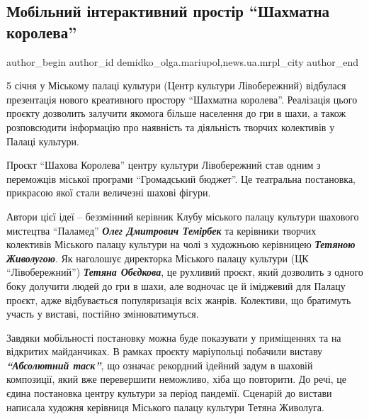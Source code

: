  
 
 
 
 
 
\subsection{Мобільний інтерактивний простір \enquote{Шахматна королева}}
\label{sec:07_01_2021.stz.news.ua.mrpl_city.1.prostir_shahmatna_koroleva}
 
\ifcmt
 author_begin
   author_id demidko_olga.mariupol,news.ua.mrpl_city
 author_end
\fi

5 січня у Міському палаці культури (Центр культури Лівобережний) відбулася
презентація нового креативного простору \enquote{Шахматна королева}. Реалізація цього
проєкту дозволить залучити якомога більше населення до гри в шахи, а також
розповсюдити інформацію про наявність та діяльність творчих колективів у Палаці
культури.


Проєкт \enquote{Шахова Королева} центру культури Лівобережний став одним з переможців
міської програми \enquote{Громадський бюджет}. Це театральна постановка, прикрасою якої
стали величезні шахові фігури.

Автори цієї ідеї – беззмінний керівник Клубу міського палацу культури шахового
мистецтва \enquote{Паламед} \emph{\textbf{Олег Дмитрович Темірбек}} та керівники творчих колективів
Міського палацу культури на чолі з художньою керівницею \emph{\textbf{Тетяною Живолугою}}. Як
наголошує директорка Міського палацу культури (ЦК \enquote{Лівобережний}) \emph{\textbf{Тетяна
Обєдкова}}, це рухливий проєкт, який дозволить з одного боку долучити людей до
гри в шахи, але водночас це й іміджевий для Палацу проєкт, адже відбувається
популяризація всіх жанрів. Колективи, що братимуть участь у виставі, постійно
змінюватимуться.

Завдяки мобільності постановку можна буде показувати у приміщеннях та на
відкритих майданчиках. В рамках проєкту маріупольці побачили виставу
\emph{\textbf{\enquote{Абсолютний таск}}}, що означає рекордний ідейний задум в шаховій композиції,
який вже перевершити неможливо, хіба що повторити. До речі, це єдина постановка
центру культури за період пандемії. Сценарій до вистави написала художня
керівниця Міського палацу культури Тетяна Живолуга.

